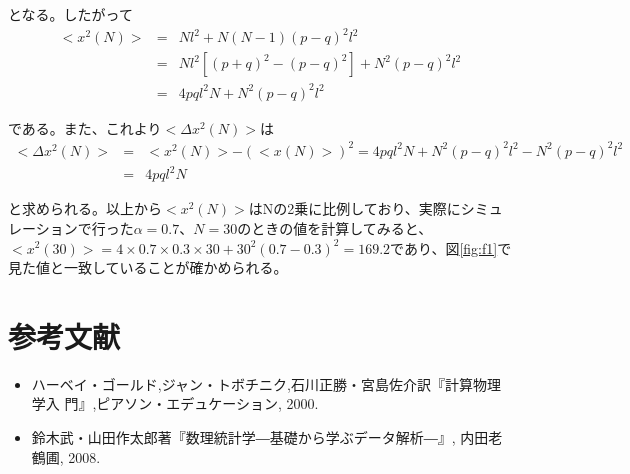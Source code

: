\documentclass{jsarticle}
\begin{document}
        となる。したがって
        \begin{eqnarray*}
            <x^{2}(N)> &=& Nl^{2} + N(N-1)(p-q)^{2}l^{2} \\
            &=& Nl^{2}\left[ (p+q)^{2}-(p-q)^{2} \right] + N^{2}(p-q)^{2}l^{2} \\
            &=& 4pql^{2}N + N^{2}(p-q)^{2}l^{2}
        \end{eqnarray*}

        である。また、これより$<\Delta x^{2}(N)>$は
        \begin{eqnarray*}
            <\Delta x^{2}(N)> &=& <x^{2}(N)>-(<x(N)>)^{2} = 4pql^{2}N + N^{2}(p-q)^{2}l^{2} - N^{2}(p-q)^{2}l^{2} \\
            &=& 4pql^{2}N
        \end{eqnarray*}
        
        と求められる。以上から$<x^{2}(N)>$はNの2乗に比例しており、実際にシミュレーションで行った$\alpha=0.7$、$N=30$のときの値を計算してみると、$<x^{2}(30)>=4\times 0.7 \times 0.3 \times 30 + 30^{2}(0.7-0.3)^{2} = 169.2$であり、図\ref{fig:f1}で見た値と一致していることが確かめられる。

        
    \section{参考文献}
        \begin{itemize}
            \item ハーベイ・ゴールド,ジャン・トボチニク,石川正勝・宮島佐介訳『計算物理学入
            門』,ピアソン・エデュケーション, 2000.
            \item 鈴木武・山田作太郎著『数理統計学―基礎から学ぶデータ解析―』, 内田老鶴圃, 2008.
        \end{itemize}
\end{document}
